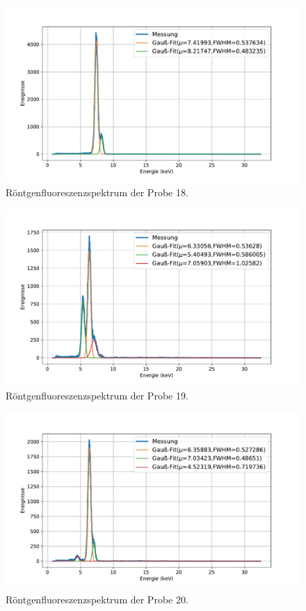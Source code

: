 \documentclass[
	a4paper,
	12pt,
	pagesize,
	ngerman
]{scrartcl}
\begin{document}
	\begin{figure}[H]
		\includegraphics[width=\textwidth]{images/18-X.pdf}
		\centering
		\caption{Röntgenfluoreszenzspektrum der Probe 18.}
	\end{figure}

	\begin{figure}[H]
		\includegraphics[width=\textwidth]{images/19-X.pdf}
		\centering
		\caption{Röntgenfluoreszenzspektrum der Probe 19.}
	\end{figure}

	\begin{figure}[H]
		\includegraphics[width=\textwidth]{images/20-Kronkorken.pdf}
		\centering
		\caption{Röntgenfluoreszenzspektrum der Probe 20.}
	\end{figure}
\end{document}
